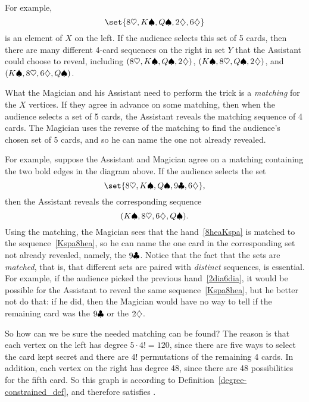 For example,
\begin{equation}\label{2dia6dia}
\set{ 8 \hea, K \spa, Q \spa, 2 \dia, 6 \dia }
\end{equation}
is an element of $X$ on the left.  If the audience selects this set of 5
cards, then there are many different 4-card sequences on the right in set
$Y$ that the Assistant could choose to reveal, including $(8 \heartsuit, K \spadesuit,
Q \spadesuit, 2 \diamondsuit)$, $(K \spadesuit, 8 \heartsuit, Q \spadesuit, 2 \diamondsuit)$, and $(K \spadesuit, 8
\heartsuit, 6 \diamondsuit, Q \spadesuit)$.

What the Magician and his Assistant need to perform the trick is a
\emph{matching} for the $X$ vertices.  If they agree in advance on some
matching, then when the audience selects a set of 5 cards, the Assistant
reveals the matching sequence of 4 cards.  The Magician uses the reverse
of the matching to find the audience's chosen set of 5 cards, and so he
can name the one not already revealed.

For example, suppose the Assistant and Magician agree on a matching
containing the two bold edges in the diagram above.  If the audience
selects the set
\begin{equation}\label{8heaKspa}
\set{8 \hea, K \spa, Q \spa, 9 \clu, 6 \dia},
\end{equation}
then the Assistant reveals the corresponding sequence
\begin{equation}\label{Kspa8hea}
(K \spadesuit, 8 \heartsuit, 6 \diamondsuit, Q \spadesuit).
\end{equation}
Using the matching, the Magician sees that the hand~\eqref{8heaKspa} is
matched to the sequence~\eqref{Kspa8hea}, so he can name the one card in
the corresponding set not already revealed, namely, the $9 \clubsuit$.  Notice
that the fact that the sets are \emph{matched}, that is, that different
sets are paired with \emph{distinct} sequences, is essential.  For
example, if the audience picked the previous hand~\eqref{2dia6dia}, it
would be possible for the Assistant to reveal the same
sequence~\eqref{Kspa8hea}, but he better not do that: if he did, then the
Magician would have no way to tell if the remaining card was the $9 \clubsuit$
or the $2 \diamondsuit$.

So how can we be sure the needed matching can be found?  The reason is
that each vertex on the left has degree $5 \cdot 4! = 120$, since there
are five ways to select the card kept secret and there are $4!$
permutations of the remaining 4 cards.  In addition, each vertex on the
right has degree 48, since there are 48 possibilities for the fifth card.
So this graph is \emph{} according to
Definition~\ref{degree-constrained_def}, and therefore satisfies .


